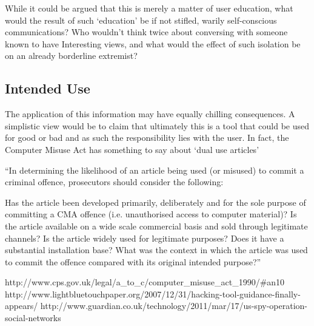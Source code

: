 While it could be argued that this is merely a matter of user education, what would the result of such ‘education’ be if not stifled, warily self-conscious communications? Who wouldn’t think twice about conversing with someone known to have Interesting views, and what would the effect of such isolation be on an already borderline extremist?

\subsection{Intended Use}
The application of this information may have equally chilling consequences. A simplistic view would be to claim that ultimately this is a tool that could be used for good or bad and as such the responsibility lies with the user.  In fact, the Computer Misuse Act has something to say about ‘dual use articles’

“In determining the likelihood of an article being used (or misused) to commit a criminal offence, prosecutors should consider the following:

    Has the article been developed primarily, deliberately and for the sole purpose of committing a CMA offence (i.e. unauthorised access to computer material)?
    Is the article available on a wide scale commercial basis and sold through legitimate channels?
    Is the article widely used for legitimate purposes?
    Does it have a substantial installation base?
    What was the context in which the article was used to commit the offence compared with its original intended purpose?”


http://www.cps.gov.uk/legal/a_to_c/computer_misuse_act_1990/#an10
http://www.lightbluetouchpaper.org/2007/12/31/hacking-tool-guidance-finally-appears/
http://www.guardian.co.uk/technology/2011/mar/17/us-spy-operation-social-networks

